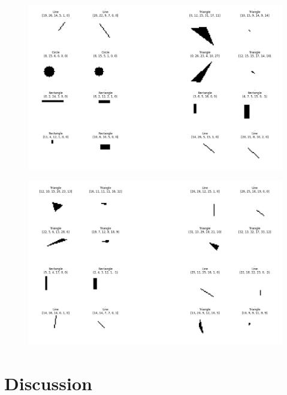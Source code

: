 \documentclass[12pt, a4paper, titlepage]{report}
\begin{document}
\begin{figure}[h]
   \includegraphics[width=1.0\textwidth]{../rc/images/all_shapes_approx_visual2.png}
   \label{fig:results_demonstration2}
\end{figure}

\begin{figure}[h]
   \includegraphics[width=1.0\textwidth]{../rc/images/all_shapes_approx_visual3.png}
   \label{fig:results_demonstration3}
\end{figure}





\chapter{Discussion}
\end{document}

